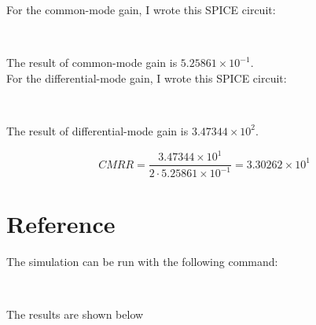 \documentclass{article}
\newcommand{\inputmintedindent}[2]{
\begin{minipage}{0.1\linewidth}\end{minipage}
\begin{minipage}{0.85\linewidth}\inputminted{#1}{#2}\end{minipage}\\[0.5em]
}
\begin{document}
For the common-mode gain, I wrote this SPICE circuit: \\

\inputmintedindent{v}{p2_1.cir}

The result of common-mode gain is $5.25861\times10^{-1}$. \\

For the differential-mode gain, I wrote this SPICE circuit: \\

\inputmintedindent{v}{p2_2.cir}

The result of differential-mode gain is $3.47344\times10^{2}$. 

$$CMRR = \frac{3.47344\times10^{1}}{2\cdot 5.25861\times10^{-1}} = 3.30262\times10^{1}$$


\section*{Reference}
The simulation can be run with the following command: \\

\inputmintedindent{shell}{run.sh}

The results are shown below

\inputmintedindent{v}{p1_1.result}

\inputmintedindent{v}{p1_2.result}

\inputmintedindent{v}{p2_1.result}

\inputmintedindent{v}{p2_2.result}
\end{document}

